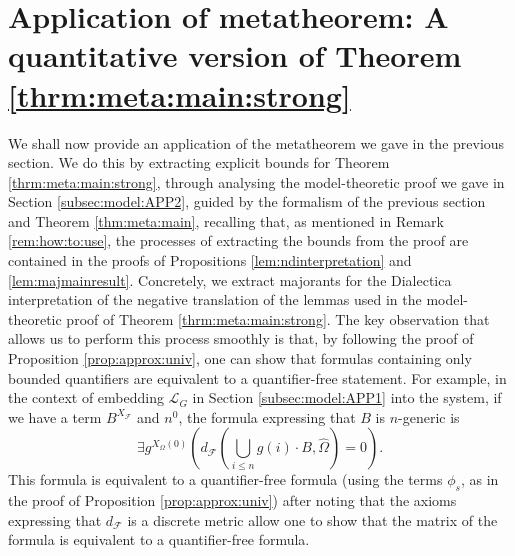 \documentclass[11pt]{amsart}
\theoremstyle{definition}
\theoremstyle{remark}
\begin{document}
\section{Application of metatheorem: A quantitative version of Theorem \ref{thrm:meta:main:strong}}
\label{sec:quant:main}
We shall now  provide an application of the metatheorem we gave in the previous section. We do this by extracting explicit bounds for Theorem \ref{thrm:meta:main:strong}, through analysing the model-theoretic proof we gave in Section \ref{subsec:model:APP2}, guided by the formalism of the previous section and Theorem \ref{thm:meta:main}, recalling that, as mentioned in Remark \ref{rem:how:to:use}, the processes of extracting the bounds from the proof are contained in the proofs of Propositions \ref{lem:ndinterpretation} and \ref{lem:majmainresult}. Concretely, we extract majorants for the Dialectica interpretation of the negative translation of the lemmas used in the model-theoretic proof of  Theorem \ref{thrm:meta:main:strong}. The key observation that allows us to perform this process smoothly is that, by following the proof of Proposition \ref{prop:approx:univ}, one can show that formulas containing only bounded quantifiers are equivalent to a quantifier-free statement. For example, in the context of embedding $\mathcal{L}_G$ in Section \ref{subsec:model:APP1} into the system, if we have a term $B^{X_{\mathcal{F}}}$ and $n^0$, the formula expressing that $B$ is $n$-generic is
\[
\exists g^{X_{\Omega}(0)}\left(d_{\mathcal{F}}\left(\bigcup_{i\le n}g(i)\cdot B,\hat{\Omega}\right) =0\right).
\]
This formula is equivalent to a quantifier-free formula (using the terms $\phi_s$, as in the proof of Proposition \ref{prop:approx:univ}) after noting that the axioms expressing that $d_{\mathcal{F}}$ is a discrete metric allow one to show that the matrix of the formula is equivalent to a quantifier-free formula. 
\end{document}
